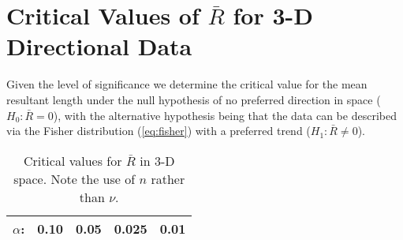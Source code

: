 \section{Critical Values of $\bar{R}$ for 3-D Directional Data}
Given the level of significance we determine the critical value for the mean resultant
length under the null hypothesis of no preferred direction in space ($H_0: \bar{R} = 0$), with the alternative hypothesis
being that the data can be described via the Fisher distribution (\ref{eq:fisher}) with a preferred trend ($H_1: \bar{R} \neq 0$).
\begin{table}[h]
\centering
\begin{tabular}{|c|cccc|} \hline
$\alpha$:  &  \bf{0.10}  & \bf{0.05} & \bf{0.025} & \bf{0.01} \\ \hline

\end{tabular}
\caption{Critical values for $\bar{R}$ in 3-D space.  Note the use of $n$ rather than $\nu$.}
\label{tbl:Critical_R3}
\end{table}

	